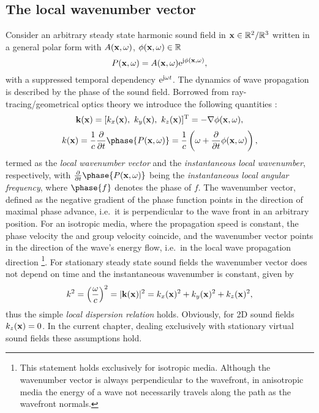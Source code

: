 \subsection{The local wavenumber vector}
Consider an arbitrary steady state harmonic sound field in $\mathbf{x} \in \mathbb{R}^2 / \mathbb{R}^3$ written in a general polar form with $A(\mathbf{x},\omega)$, $\phi(\mathbf{x},\omega) \in \mathbb{R}$
\begin{equation}
P(\mathbf{x},\omega) = A(\mathbf{x},\omega)\mathrm{e}^{\mathrm{j} \phi(\mathbf{x},\omega)},
\label{eq:25D_WFS:general_sf}
\end{equation}
%
with a suppressed temporal dependency $\mathrm{e}^{\mathrm{j} \omega t}$.
The dynamics of wave propagation is described by the phase of the sound field.
Borrowed from ray-tracing/geometrical optics theory we introduce the following quantities \cite{Romer2005,Carozzi2004}:
%
\begin{equation}
\vk(\vx) = [k_x(\vx),\ k_y(\vx),\ k_z(\vx)]^{\mathrm{T}} = -\nabla \phi(\vx,\omega),
\end{equation}
%
\begin{equation}
k(\vx) =  \frac{1}{c} \frac{\partial}{\partial t} \phase{P(\vx,\omega)}  = \frac{1}{c} \left( \omega + \frac{\partial}{\partial t} \phi(\vx,\omega) \right),
\end{equation}
%
termed as the \emph{local wavenumber vector} and the \emph{instantaneous local wavenumber}, respectively, with $ \frac{\partial}{\partial t} \phase{P(\vx,\omega)} $ being the \emph{instantaneous local angular frequency}, where $\phase{f}$ denotes the phase of $f$.
The wavenumber vector, defined as the negative gradient of the phase function points in the direction of maximal phase advance, i.e.\ it is perpendicular to the wave front in an arbitrary position.
For an isotropic media, where the propagation speed is constant, the phase velocity the and group velocity coincide, and the wavenumber vector points in the direction of the wave's energy flow, i.e.\ in the local wave propagation direction \footnote{This statement holds exclusively for isotropic media.
Although the wavenumber vector is always perpendicular to the wavefront, in anisotropic media the energy of a wave not necessarily travels along the path as the wavefront normals\cite{Pollard1977}.}.
For stationary steady state sound fields the wavenumber vector does not depend on time and the instantaneous wavenumber is constant, given by 
\begin{equation}
k^2 = \left( \frac{\omega}{c} \right)^2 = |\mathbf{k}(\mathbf{x})|^2 = k_x(\mathbf{x})^2 + k_y(\mathbf{x})^2 + k_z(\mathbf{x})^2,
\end{equation}
thus the simple \emph{local dispersion relation } holds.
Obviously, for 2D sound fields $k_z(\mathbf{x})=0$.
In the current chapter, dealing exclusively with stationary virtual sound fields these assumptions hold.

